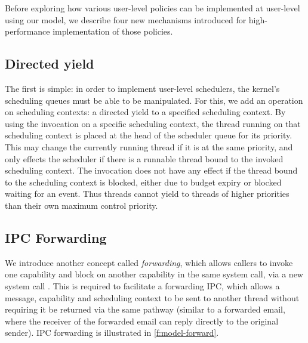 Before exploring how various user-level policies can be implemented at user-level using our model, we describe
four new mechanisms introduced for high-performance implementation of those policies.

\subsection{Directed yield}

The first is simple: in order to implement user-level schedulers, the kernel's scheduling queues
must be able to be manipulated. For this, we add an operation on scheduling contexts: a
directed yield to a specified scheduling context. By using the \scyieldto invocation on 
a specific scheduling context, the thread running on that scheduling context is placed at the head
of the scheduler queue for its priority. 
This may change the currently running thread if it is at the same priority, and only effects the
scheduler if there is a runnable thread bound to the invoked scheduling context. The invocation does
not have any effect if the thread bound to the scheduling context is blocked, either due to budget
expiry or blocked waiting for an event. Thus threads cannot
yield to threads of higher priorities than their own maximum control priority.

\subsection{IPC Forwarding}
\label{sec:ipc-forwarding}

We introduce another concept called \emph{forwarding}, which allows callers to
invoke one capability and block on another capability in the same system call, via
a new system call \nbsendrecv. This is required to
facilitate a forwarding \gls{IPC}, which allows a message, capability and scheduling context to be
sent to another thread without requiring it be returned via the same pathway (similar to a forwarded
email, where the receiver of the forwarded email can reply directly to the original sender).
IPC forwarding is illustrated in \cref{f:model-forward}. 

